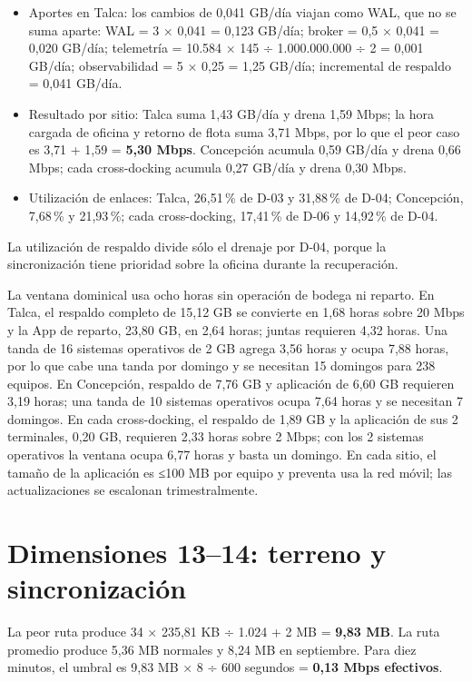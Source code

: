 \begin{itemize}
  \item Aportes en Talca: los cambios de 0,041 GB/día viajan como WAL, que no se suma aparte: WAL = 3 × 0,041 = 0,123 GB/día; broker = 0,5 × 0,041 = 0,020 GB/día; telemetría = 10.584 × 145 ÷ 1.000.000.000 ÷ 2 = 0,001 GB/día; observabilidad = 5 × 0,25 = 1,25 GB/día; incremental de respaldo = 0,041 GB/día.
  \item Resultado por sitio: Talca suma 1,43 GB/día y drena 1,59 Mbps; la hora cargada de oficina y retorno de flota suma 3,71 Mbps, por lo que el peor caso es 3,71 + 1,59 = \textbf{5,30 Mbps}. Concepción acumula 0,59 GB/día y drena 0,66 Mbps; cada cross-docking acumula 0,27 GB/día y drena 0,30 Mbps.
  \item Utilización de enlaces: Talca, 26,51\,\% de D-03 y 31,88\,\% de D-04; Concepción, 7,68\,\% y 21,93\,\%; cada cross-docking, 17,41\,\% de D-06 y 14,92\,\% de D-04.
\end{itemize}

La utilización de respaldo divide sólo el drenaje por D-04, porque la sincronización tiene prioridad sobre la oficina durante la recuperación.

La ventana dominical usa ocho horas sin operación de bodega ni reparto. En Talca, el respaldo completo de 15,12 GB se convierte en 1,68 horas sobre 20 Mbps y la App de reparto, 23,80 GB, en 2,64 horas; juntas requieren 4,32 horas. Una tanda de 16 sistemas operativos de 2 GB agrega 3,56 horas y ocupa 7,88 horas, por lo que cabe una tanda por domingo y se necesitan 15 domingos para 238 equipos. En Concepción, respaldo de 7,76 GB y aplicación de 6,60 GB requieren 3,19 horas; una tanda de 10 sistemas operativos ocupa 7,64 horas y se necesitan 7 domingos. En cada cross-docking, el respaldo de 1,89 GB y la aplicación de sus 2 terminales, 0,20 GB, requieren 2,33 horas sobre 2 Mbps; con los 2 sistemas operativos la ventana ocupa 6,77 horas y basta un domingo. En cada sitio, el tamaño de la aplicación es ≤100 MB por equipo y preventa usa la red móvil; las actualizaciones se escalonan trimestralmente.

\section{Dimensiones 13--14: terreno y sincronización}
\label{sec:anexo-4b-dimensiones-13-14}

La peor ruta produce 34 × 235,81 KB ÷ 1.024 + 2 MB = \textbf{9,83 MB}. La ruta promedio produce 5,36 MB normales y 8,24 MB en septiembre. Para diez minutos, el umbral es 9,83 MB × 8 ÷ 600 segundos = \textbf{0,13 Mbps efectivos}.

